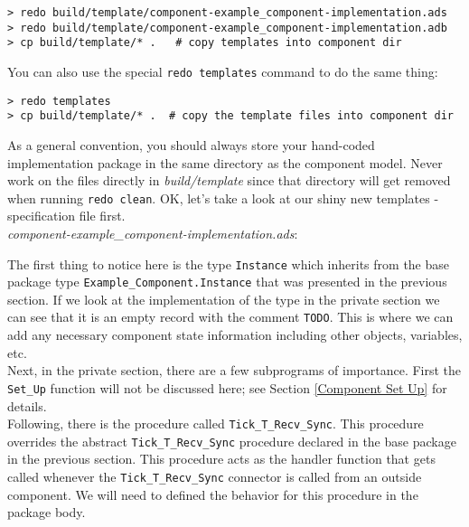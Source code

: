 \vspace{5mm} %
\begin{verbatim}
> redo build/template/component-example_component-implementation.ads 
> redo build/template/component-example_component-implementation.adb 
> cp build/template/* .   # copy templates into component dir
\end{verbatim}
\vspace{5mm} %

You can also use the special \texttt{redo templates} command to do the same thing:

\vspace{5mm} %
\begin{verbatim}
> redo templates
> cp build/template/* .  # copy the template files into component dir 
\end{verbatim}
\vspace{5mm} %

As a general convention, you should always store your hand-coded implementation package in the same directory as the component model. Never work on the files directly in \textit{build/template} since that directory will get removed when running \texttt{redo clean}. OK, let's take a look at our shiny new templates - specification file first. \\

\textit{component-example\_component-implementation.ads}:

The first thing to notice here is the type \texttt{Instance} which inherits from the base package type \texttt{Example\_Component.Instance} that was presented in the previous section. If we look at the implementation of the type in the private section we can see that it is an empty record with the comment \texttt{TODO}. This is where we can add any necessary component state information including other objects, variables, etc. \\

Next, in the private section, there are a few subprograms of importance. First the \texttt{Set\_Up} function will not be discussed here; see Section \ref{Component Set Up} for details. \\

Following, there is the procedure called \texttt{Tick\_T\_Recv\_Sync}. This procedure overrides the abstract \texttt{Tick\_T\_Recv\_Sync} procedure declared in the base package in the previous section. This procedure acts as the handler function that gets called whenever the \texttt{Tick\_T\_Recv\_Sync} connector is called from an outside component. We will need to defined the behavior for this procedure in the package body. \\

